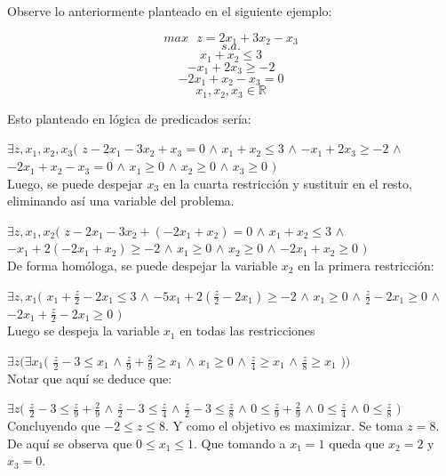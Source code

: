 \documentclass[12pt]{report}
\begin{document}
Observe lo anteriormente planteado en el siguiente ejemplo:

$$max \text{ }z= 2x_1 + 3x_2 - x_3 $$
$$s.a.$$
$$ x_1 + x_2 \leq  3 $$
$$ -x_1 + 2x_3 \geq  -2 $$
$$ -2x_1 + x_2 - x_3 = 0 $$
$$ x_1, x_2, x_3 \in \mathbb{R}  $$

Esto planteado en lógica de predicados sería:

$\exists z,x_1,x_2,x_3 ($
$z - 2x_1 - 3x_2 + x_3 = 0$ $\land$
$ x_1 + x_2 \leq  3 $ $\land$
$ -x_1 + 2x_3 \geq  -2 $ $\land$
$ -2x_1 + x_2 - x_3 = 0 $ $\land$
$ x_1\geq  0 $ $\land$ 
$ x_2\geq  0 $ $\land$ 
$ x_3\geq  0 $ 
$)$\\

Luego, se puede despejar $x_3$ en la cuarta restricción y sustituir en el resto, eliminando así una variable del problema.

$\exists z,x_1,x_2($
$z - 2x_1 - 3x_2 + (-2x_1 + x_2) = 0$ $\land$
$ x_1 + x_2 \leq  3 $ $\land$
$ -x_1 + 2(-2x_1 + x_2) \geq  -2 $ $\land$
$ x_1\geq  0 $ $\land$ 
$ x_2\geq  0 $ $\land$ 
$ -2x_1 + x_2\geq  0 $ 
$)$\\

De forma homóloga, se puede despejar la variable $x_2$ en la primera restricción:

$\exists z,x_1 ($
$ x_1 + \frac z 2 -2x_1 \leq  3 $ $\land$
$ -5x_1 + 2(\frac z 2 -2x_1) \geq  -2 $ $\land$
$ x_1\geq  0 $ $\land$ 
$ \frac z 2 -2x_1 \geq  0 $ $\land$ 
$ -2x_1 + \frac z 2 -2x_1 \geq  0 $
$)$\\

Luego se despeja la variable $x_1$ en todas las restricciones

$\exists z (\exists x_1 ($
$ \frac z 2 - 3 \leq   x_1 $ $\land$
$ \frac z 9 + \frac 2 9 \geq  x_1 $ $\land$
$ x_1\geq  0 $ $\land$ 
$ \frac z 4 \geq  x_1 $ $\land$ 
$ \frac z 8 \geq  x_1 $ $))$\\

Notar que aquí se deduce que:

$\exists z ($
$ \frac z 2 - 3 \leq   \frac z 9 + \frac 2 9 $ $\land$
$ \frac z 2 - 3 \leq  \frac z 4  $ $\land$
$ \frac z 2 - 3 \leq  \frac z 8 $ $\land$
$ 0 \leq   \frac z 9 + \frac 2 9 $ $\land$
$ 0 \leq  \frac z 4  $ $\land$
$ 0 \leq  \frac z 8 $ 
$)$\\

Concluyendo que $-2\leq  z \leq  8$. Y como el objetivo es maximizar. Se toma $z=8$. De aquí se observa que $0\leq  x_1 \leq 1$. Que tomando a $x_1=1$ queda que $x_2=2$ y $x_3 = 0$.\\
\end{document}
